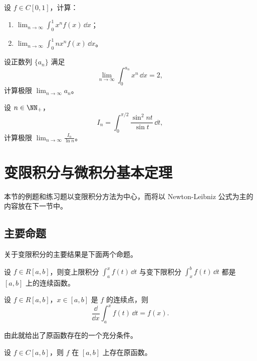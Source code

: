 \begin{xexercise}[8]
设 $f\in C[0,1]$，计算：
\begin{enumerate}[label=(\arabic*)]
  \item $\displaystyle\lim_{n\to\infty}\int_0^1x^nf(x)\,\dd x$；
  \item $\displaystyle\lim_{n\to\infty}\int_0^1nx^nf(x)\,\dd x$。
\end{enumerate}
\end{xexercise}

\begin{xexercise}[9]
设正数列 $\{a_n\}$ 满足
\[
  \lim_{n\to\infty}\int_0^{a_n}x^n\,\dd x=2,
\]
计算极限 $\lim_{n\to\infty}a_n$。
\end{xexercise}

\begin{xexercise}[10]
设 $n\in\NN_+$，
\[
  I_n=\int_0^{\pi/2}\frac{\sin^2nt}{\sin t}\,\dd t,
\]
计算极限 $\displaystyle\lim_{n\to\infty}\frac{I_n}{\ln n}$。
\end{xexercise}

\section{变限积分与微积分基本定理}

本节的例题和练习题以变限积分方法为中心，而将以 Newton-Leibniz 公式为主的内容放在下一节中。

\subsection{主要命题}

关于变限积分的主要结果是下面两个命题。

\begin{xtheorem}[10.3.1]
设 $f\in R[a,b]$，则变上限积分 $\int_a^x f(t)\,\dd t$ 与变下限积分 $\int_x^b f(t)\,\dd t$ 都是 $[a,b]$ 上的连续函数。
\end{xtheorem}

\begin{xtheorem}[10.3.2]
设 $f\in R[a,b]$，$x\in[a,b]$ 是 $f$ 的连续点，则
\[
  \frac{\dd}{\dd x}\int_a^x f(t)\,\dd t=f(x).
\]
\end{xtheorem}

由此就给出了原函数存在的一个充分条件。

\begin{xtheorem}[10.3.3（原函数存在定理）]
设 $f\in C[a,b]$，则 $f$ 在 $[a,b]$ 上存在原函数。
\end{xtheorem}

